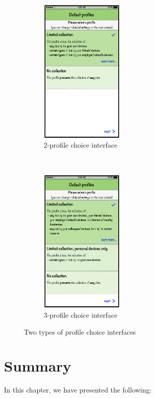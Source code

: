 \begin{figure}[htb]
	\centering
	\begin{subfigure}[t]{0.24\textwidth}
		\centering
		\includegraphics[height=2.8in]{figures/profiles2.pdf}
		\caption{2-profile choice interface}
		\label{fig:2profile_default_setting}
	\end{subfigure}%
	~~~~~~~~~
	\begin{subfigure}[t]{0.24\textwidth}
		\centering
		\includegraphics[height=2.8in]{figures/profiles3.pdf}
		\caption{3-profile choice interface}
		\label{fig:3profile_default_setting}
	\end{subfigure}%
	\caption{Two types of profile choice interfaces}
\end{figure}

\section{Summary}
In this chapter, we have presented the following:

